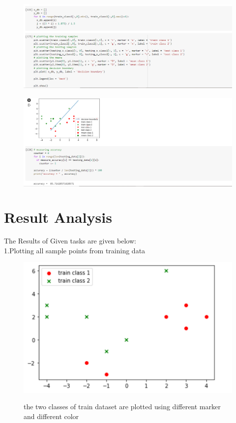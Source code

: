 \documentclass[12pt]{article}
\begin{document}
\begin{figure}[H]
\includegraphics[scale = .7]{p6.PNG}
\end{figure}

\begin{figure}[H]
\includegraphics[scale = .7]{p7.PNG}
\end{figure}

\newpage
\section{Result Analysis}
The Results of Given tasks are given below:\\
\Large1.Plotting all sample points from training data \\


\begin{figure}[htbp]
{\includegraphics{res1.PNG}}
\caption{the two classes of train dataset are plotted using different marker and different color\\}
\label{fig}
\end{figure}
\newpage
\end{document}
